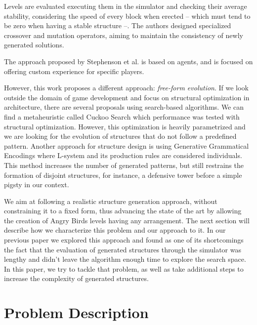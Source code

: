 \documentclass[a4paper,twoside]{article}
\begin{document}
Levels are evaluated executing them in the simulator and checking
their average stability, considering the speed of every block when
erected -- which must tend to be zero when having a stable structure
--. The authors designed specialized crossover and mutation operators,
aiming to maintain the consistency of newly generated solutions.

The approach proposed by Stephenson et al. \cite{stephenson2019agent}
is based on agents, and is focused on offering custom experience for
specific players. 

However, this work proposes a different approach: \textit{free-form
  evolution}.  If we look outside the domain of game development and
focus on structural optimization in architecture, there are several
proposals using search-based algorithms. We can find a metaheuristic
called Cuckoo Search \cite{gandomi2013cuckoo} which performance was
tested with structural optimization. However, this optimization is
heavily parametrized and we are looking for the evolution of
structures that do not follow a predefined pattern.  Another approach
for structure design is using Generative Grammatical Encodings
\cite{hornby2001advantages} where L-system and its production rules
are considered individuals. This method increases the number of
generated patterns,  but still restrains the formation of disjoint
structures, for instance, a defensive tower before a simple pigsty in
our context. 

We aim at following a realistic structure generation approach, without
constraining it to a fixed form, thus advancing the state of the art
by allowing the creation of Angry Birds levels having any
arrangement. The next section will describe how we characterize this
problem and our approach to it. In our previous paper
\cite{DBLP:conf/evoW/CalleGGV19anon} we explored this approach and found
as one of its shortcomings the fact that the evaluation of generated
structures through the simulator was lengthy and didn't leave the
algorithm enough time to explore the search space. In this paper, we
try to tackle that problem, as well as take additional steps to
increase the complexity of generated structures. 

\section{Problem Description}
\label{sec:angry}
\end{document}
